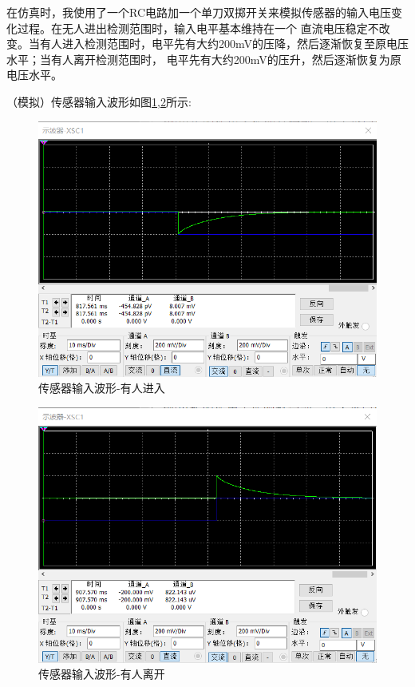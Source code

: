 \documentclass{article}
\begin{document}
\begin{spacing}{1.5}
    在仿真时，我使用了一个RC电路加一个单刀双掷开关来模拟传感器的输入电压变化过程。在无人进出检测范围时，输入电平基本维持在一个
    直流电压稳定不改变。当有人进入检测范围时，电平先有大约200mV的压降，然后逐渐恢复至原电压水平；当有人离开检测范围时，
    电平先有大约200mV的压升，然后逐渐恢复为原电压水平。

    （模拟）传感器输入波形如图\ref{fig:sim4_result2},\ref{fig:sim4_result3}所示:

    \begin{figure}[H]
        \centering
        \includegraphics[scale=0.4]{fig/sim/sim4_result2.png}
        \caption{传感器输入波形-有人进入}
        \label{fig:sim4_result2}
    \end{figure}
    
    \begin{figure}[H]
        \centering
        \includegraphics[scale=0.4]{fig/sim/sim4_result3.png}
        \caption{传感器输入波形-有人离开}
        \label{fig:sim4_result3}
    \end{figure}


\end{spacing}
\end{document}
